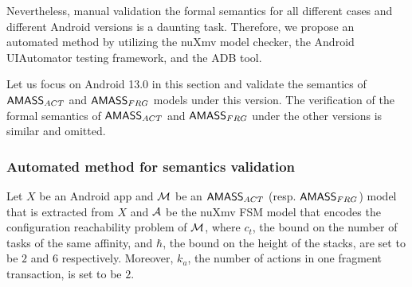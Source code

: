 
Nevertheless, manual validation the formal semantics for all different cases and different Android versions is a daunting task. %
Therefore, we propose an automated method %
by utilizing %
the nuXmv model checker, the Android UIAutomator testing framework, and the ADB tool. 

Let us focus on Android 13.0 in this section and validate the semantics of $\textsf{AMASS}_{ACT}$ and $\textsf{AMASS}_{FRG}$ models under this version. 
The verification of the formal semantics of $\textsf{AMASS}_{ACT}$ and $\textsf{AMASS}_{FRG}$  under the other versions is similar and omitted. 





\subsubsection{Automated method for semantics validation}\label{sec-aut-val}

Let $X$ be an Android app and ${\mathcal{M} }$ be an $\textsf{AMASS}_{ACT}$ (resp. $\textsf{AMASS}_{FRG}$) model that is extracted from $X$ and ${\mathcal{A} }$ be the nuXmv FSM model that encodes the configuration reachability problem of ${\mathcal{M} }$, where $c_t$, the bound on the number of tasks of the same affinity, and $\hbar$, the bound on the height of the stacks, are set to be $2$ and $6$ respectively. 
Moreover, $k_a$, the number of actions in one fragment transaction, is set to be $2$. 


